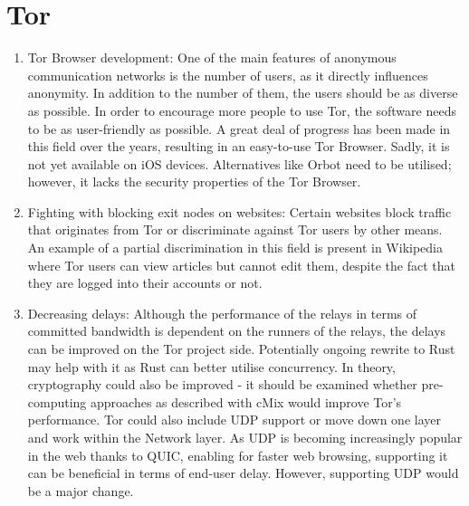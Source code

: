 \section{Tor}
\begin{enumerate}
    \item Tor Browser development: One of the main features of anonymous communication networks is the number of users, as it directly influences anonymity. In addition to the number of them, the users should be as diverse as possible. In order to encourage more people to use Tor, the software needs to be as user-friendly as possible. A great deal of progress has been made in this field over the years, resulting in an easy-to-use Tor Browser. Sadly, it is not yet available on iOS devices. Alternatives like Orbot need to be utilised; however, it lacks the security properties of the Tor Browser.
    \item Fighting with blocking exit nodes on websites: Certain websites block traffic that originates from Tor or discriminate against Tor users by other means. An example of a partial discrimination in this field is present in Wikipedia where Tor users can view articles but cannot edit them, despite the fact that they are logged into their accounts or not.
    \item Decreasing delays: Although the performance of the relays in terms of committed bandwidth is dependent on the runners of the relays, the delays can be improved on the Tor project side. Potentially ongoing rewrite to Rust may help with it as Rust can better utilise concurrency. In theory, cryptography could also be improved - it should be examined whether pre-computing approaches as described with cMix would improve Tor’s performance. Tor could also include UDP support or move down one layer and work within the Network layer. As UDP is becoming increasingly popular in the web thanks to QUIC, enabling for faster web browsing, supporting it can be beneficial in terms of end-user delay. However, supporting UDP would be a major change.
\end{enumerate}

